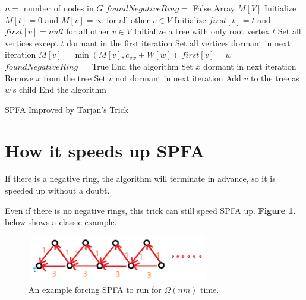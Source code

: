 \documentclass{article}
\begin{document}
\begin{algorithm}
    $n=$ number of nodes in $G$\;
    $foundNegativeRing=$ False\;
    Array $M[V]$\;
    Initialize $M[t]=0$ and $M[v]=\infty$ for all other $v\in V$\;
    Initialize $first[t]=t$ and $first[v]=null$ for all other $v\in V$\;
    Initialize a tree with only root vertex $t$\;
    Set all vertices except $t$ dormant in the first iteration\;
     {
        Set all vertices dormant in next iteration\;
         {
             {
                $M[v]=\min(M[v],c_{vw}+W[w])$\;
                 {
                    $first[v]=w$\;
                     {
                         {
                            $foundNegativeRing=$ True\;
                            End the algorithm\;
                        }
                        Set $x$ dormant in next iteration\;
                        Remove $x$ from the tree\;
                    }
                    Set $v$ not dormant in next iteration\;
                    Add $v$ to the tree as $w$'s child\;
                }
            }
        }
         {
            End the algorithm\;
        }
    }
    \caption{SPFA Improved by Tarjan's Trick}
\end{algorithm}

\section{How it speeds up SPFA}

If there is a negative ring, the algorithm will terminate in advance, so it is speeded up without a doubt.

Even if there is no negative rings, this trick can still speed SPFA up. \textbf{Figure 1.} below shows a classic example.

\begin{figure}[h]  %
    \centering
    \includegraphics[height=2cm,width=8cm]{figure/1.png}
    \caption{An example forcing SPFA to run for $\Omega(nm)$ time.}
    \label{1}
\end{figure}
\end{document}
